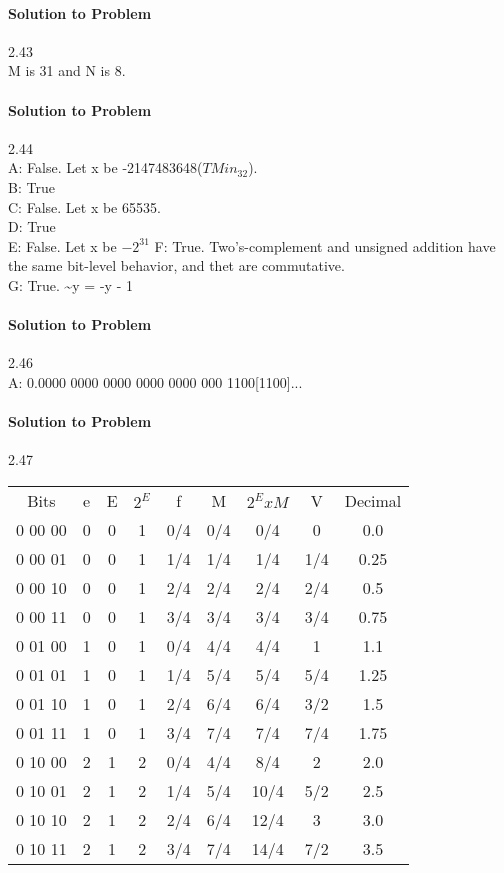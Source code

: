 \documentclass{report}
\begin{document}
\paragraph{Solution to Problem} 2.43 \\
M is 31 and N is 8.

\paragraph{Solution to Problem} 2.44 \\
A: False. Let x be -2147483648($TMin_32$). \\
B: True \\
C: False. Let x be 65535. \\
D: True \\
E: False. Let x be $-2^{31}$
F: True. Two's-complement and unsigned addition have the same bit-level behavior, and thet are commutative. \\
G: True. \textasciitilde y = -y - 1

\paragraph{Solution to Problem} 2.46 \\
A: 0.0000 0000 0000 0000 0000 000 1100[1100]...

\paragraph{Solution to Problem} 2.47 \\
\begin{center}
\begin{tabular}{ |c|c|c|c|c|c|c|c|c| } 
\hline
 Bits & e & E & $2^E$ & f & M & $2^E x M$ & V & Decimal \\
0 00 00 & 0 & 0 & 1 & 0/4 & 0/4 & 0/4 & 0 & 0.0 \\
0 00 01 & 0 & 0 & 1 & 1/4 & 1/4 & 1/4 & 1/4 & 0.25 \\
0 00 10 & 0 & 0 & 1 & 2/4 & 2/4 & 2/4 & 2/4 & 0.5 \\
0 00 11 & 0 & 0 & 1 & 3/4 & 3/4 & 3/4 & 3/4 & 0.75 \\
0 01 00 & 1 & 0 & 1 & 0/4 & 4/4 & 4/4 & 1 & 1.1 \\
0 01 01 & 1 & 0 & 1 & 1/4 & 5/4 & 5/4 & 5/4 & 1.25 \\
0 01 10 & 1 & 0 & 1 & 2/4 & 6/4 & 6/4 & 3/2 & 1.5 \\
0 01 11 & 1 & 0 & 1 & 3/4 & 7/4 & 7/4 & 7/4 & 1.75 \\
0 10 00 & 2 & 1 & 2 & 0/4 & 4/4 & 8/4 & 2 & 2.0 \\
0 10 01 & 2 & 1 & 2 & 1/4 & 5/4 & 10/4 & 5/2 & 2.5 \\
0 10 10 & 2 & 1 & 2 & 2/4 & 6/4 & 12/4 & 3 & 3.0 \\
0 10 11 & 2 & 1 & 2 & 3/4 & 7/4 & 14/4 & 7/2 & 3.5 \\
\hline
\end{tabular}
\end{center}
\end{document}
